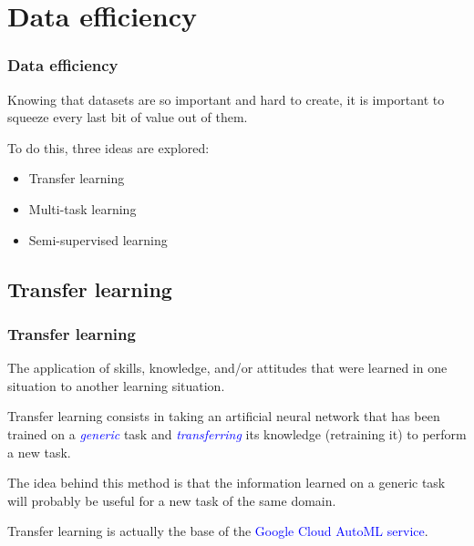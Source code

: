 \documentclass[10pt]{beamer}
\begin{document}
\section{Data efficiency}

\begin{frame}
  \frametitle{Data efficiency}

  Knowing that datasets are so important and hard to create, it is
  important to squeeze every last bit of value out of them.

  \bigskip

  To do this, three ideas are explored:

  \begin{itemize}
    \item Transfer learning
    \item Multi-task learning
    \item Semi-supervised learning
  \end{itemize}

\end{frame}

\subsection{Transfer learning}

\begin{frame}

  \frametitle{Transfer learning}

  \begin{displayquote}[Perkins, 1992]
  The application of skills, knowledge, and/or attitudes that were
  learned in one situation to another learning situation.
  \end{displayquote}

  \bigskip

  Transfer learning consists in taking an artificial neural network
  that has been trained on a \textcolor{blue}{\emph{generic}} task and
  \textcolor{blue}{\emph{transferring}} its knowledge (retraining it)
  to perform a new task.

  \bigskip

  The idea behind this method is that the information learned on a
  generic task will probably be useful for a new task of the same
  domain.

  \bigskip

  Transfer learning is actually the base of the
  \textcolor{blue}{Google Cloud AutoML service}.

\end{frame}
\end{document}
